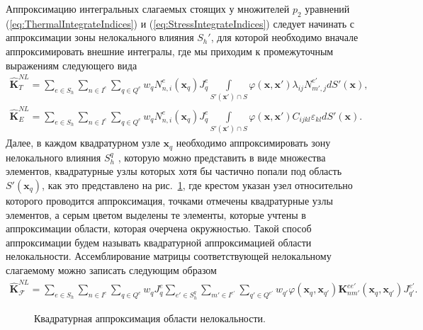 Аппроксимацию интегральных слагаемых стоящих у множителей $p_2$ уравнений (\ref{eq:ThermalIntegrateIndices}) и (\ref{eq:StressIntegrateIndices}) следует начинать с аппроксимации зоны нелокального влияния $S_h'$, для которой необходимо вначале аппроксимировать внешние интегралы, где мы приходим к промежуточным выражениям следующего вида
\begin{gather*}
	\widehat{\textbf{K}}^{NL}_T =
	\sum\limits_{e \in S_h}
	\sum\limits_{n \in I^e}
	\sum\limits_{q \in Q^e}
	w_q N_{n,i}^e (\boldsymbol{x}_q) J_q^e
	\int\limits_{S'(\boldsymbol{x}') \cap S}
	\varphi( \boldsymbol{x}, \boldsymbol{x}' )
	\lambda_{ij}
	N_{m', j}^{e'} dS'(\boldsymbol{x}), \\
	\widehat{\textbf{K}}^{NL}_E =
	\sum\limits_{e \in S_h}
	\sum\limits_{n \in I^e}
	\sum\limits_{q \in Q^e}
	w_q N_{n,i}^e (\boldsymbol{x}_q) J_q^e
	\int\limits_{S'(\boldsymbol{x}') \cap S}
	\varphi(\boldsymbol{x}, \boldsymbol{x}') C_{ijkl} \varepsilon_{kl} dS'(\boldsymbol{x}).
\end{gather*}
Далее, в каждом квадратурном узле $\boldsymbol{x}_q$ необходимо аппроксимировать зону нелокального влияния $S_h^q$ \cite{Pisano1}, которую можно представить в виде множества элементов, квадратурные узлы которых хотя бы частично попали под область $S'(\boldsymbol{x}_q)$, как это представлено на рис.~\ref{fig:ApproxSQ}, где крестом указан узел относительно которого проводится аппроксимация, точками отмечены квадратурные узлы элементов, а серым цветом выделены те элементы, которые учтены в аппроксимации области, которая очерчена окружностью. Такой способ аппроксимации будем называть квадратурной аппроксимацией области нелокальности. Ассемблирование матрицы соответствующей нелокальному слагаемому можно записать следующим образом
\begin{gather}
	\label{eq:ApproxNonloc}
	\widehat{\textbf{K}}^{NL}_{\mathcal{F}} =
	\sum\limits_{e \in S_h}
	\sum\limits_{n \in I^e}
	\sum\limits_{q \in Q^e}
	w_q J_q^e
	\sum\limits_{e' \in S_h^q}
	\sum\limits_{m' \in I^{e'}}
	\sum\limits_{q' \in Q^{e'}}
	w_{q'} \varphi(\boldsymbol{x}_q, \boldsymbol{x}_{q'}) 
	\textbf{K}_{nm'}^{e e'}(\boldsymbol{x}_q, \boldsymbol{x}_{q'}) J_{q'}^{e'}.
\end{gather}

\begin{figure}[ht]
    \caption{Квадратурная аппроксимация области нелокальности.}\label{fig:ApproxSQ}
\end{figure}


